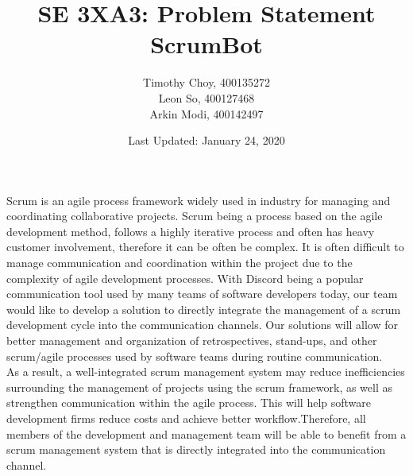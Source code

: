 \documentclass[12pt]{article}
\title{SE 3XA3: Problem Statement\\ScrumBot}
\author{
	Timothy Choy, 400135272\\
	Leon So, 400127468\\
	Arkin Modi, 400142497
}
\date{Last Updated: January 24, 2020}
\begin{document}
\maketitle

Scrum is an agile process framework widely used in industry for managing and coordinating collaborative projects. Scrum being a process based on the agile development method, follows a highly iterative process and often has heavy customer involvement, therefore it can be often be complex. It is often difficult to manage communication and coordination within the project due to the complexity of agile development processes. With Discord being a popular communication tool used by many teams of software developers today, our team would like to develop a solution to directly integrate the management of a scrum development cycle into the communication channels. Our solutions will allow for better management and organization of retrospectives, stand-ups, and other scrum/agile processes used by software teams during routine communication.\\

As a result, a well-integrated scrum management system may reduce inefficiencies surrounding the management of projects using the scrum framework, as well as strengthen communication within the agile process. This will help software development firms reduce costs and achieve better workflow.Therefore, all members of the development and management team will be able to benefit from a scrum management system that is directly integrated into the communication channel.
\end{document}
